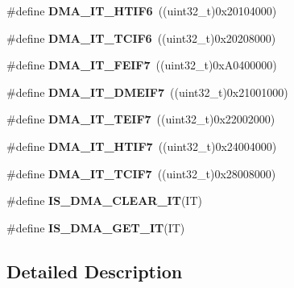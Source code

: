 \begin{DoxyCompactItemize}
\mbox{\label{group___d_m_a__interrupts__definitions_gae43cd288bb0b6f1cbb313dc5690f174f}} 
\#define {\bfseries D\+M\+A\+\_\+\+I\+T\+\_\+\+H\+T\+I\+F6}~((uint32\+\_\+t)0x20104000)
\item 
\mbox{\label{group___d_m_a__interrupts__definitions_ga895e7dfd7ddf4879181e475eb322f1b4}} 
\#define {\bfseries D\+M\+A\+\_\+\+I\+T\+\_\+\+T\+C\+I\+F6}~((uint32\+\_\+t)0x20208000)
\item 
\mbox{\label{group___d_m_a__interrupts__definitions_ga742d0f7f8437ab5fa4f1ad0c7fb0112b}} 
\#define {\bfseries D\+M\+A\+\_\+\+I\+T\+\_\+\+F\+E\+I\+F7}~((uint32\+\_\+t)0x\+A0400000)
\item 
\mbox{\label{group___d_m_a__interrupts__definitions_gaed099553b36827c2978208d288f9a848}} 
\#define {\bfseries D\+M\+A\+\_\+\+I\+T\+\_\+\+D\+M\+E\+I\+F7}~((uint32\+\_\+t)0x21001000)
\item 
\mbox{\label{group___d_m_a__interrupts__definitions_ga4d25902b63630db383fd3983581fb8ee}} 
\#define {\bfseries D\+M\+A\+\_\+\+I\+T\+\_\+\+T\+E\+I\+F7}~((uint32\+\_\+t)0x22002000)
\item 
\mbox{\label{group___d_m_a__interrupts__definitions_gae95460193a9f02e03a6aaf01ecb9a501}} 
\#define {\bfseries D\+M\+A\+\_\+\+I\+T\+\_\+\+H\+T\+I\+F7}~((uint32\+\_\+t)0x24004000)
\item 
\mbox{\label{group___d_m_a__interrupts__definitions_ga2761f6621db0231ddc8294a8eb1c8e42}} 
\#define {\bfseries D\+M\+A\+\_\+\+I\+T\+\_\+\+T\+C\+I\+F7}~((uint32\+\_\+t)0x28008000)
\item 
\#define {\bfseries I\+S\+\_\+\+D\+M\+A\+\_\+\+C\+L\+E\+A\+R\+\_\+\+IT}(IT)
\item 
\#define {\bfseries I\+S\+\_\+\+D\+M\+A\+\_\+\+G\+E\+T\+\_\+\+IT}(IT)
\end{DoxyCompactItemize}


\subsection{Detailed Description}


